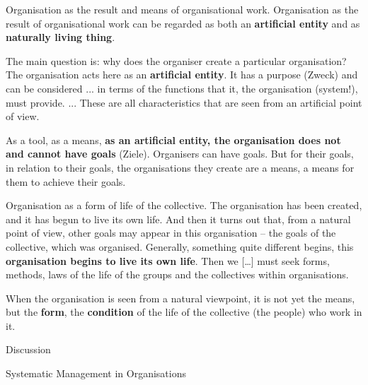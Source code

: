 \documentclass{beamer}
\begin{document}
\begin{frame}{Organisation as the result and means of organisational work.}
Organisation as the result of organisational work can be regarded as both an
\textbf{artificial entity} and as \textbf{naturally living thing}.

The main question is: why does the organiser create a particular organisation?
The organisation acts here as an \textbf{artificial entity}. It has a purpose
(Zweck) and can be considered ... in terms of the functions that it, the
organisation (system!), must provide. ... These are all characteristics that
are seen from an artificial point of view.

As a tool, as a means, \textbf{as an artificial entity, the organisation does
  not and cannot have goals} (Ziele). Organisers can have goals. But for their
goals, in relation to their goals, the organisations they create are a means,
a means for them to achieve their goals.

\end{frame}

\begin{frame}{Organisation as a form of life of the collective.}
The organisation has been created, and it has begun to live its own life. And
then it turns out that, from a natural point of view, other goals may appear
in this organisation – the goals of the collective, which was
organised. Generally, something quite different begins, this
\textbf{organisation begins to live its own life}. Then we [\ldots] must seek
forms, methods, laws of the life of the groups and the collectives within
organisations.

When the organisation is seen from a natural viewpoint, it is not yet the
means, but the \textbf{form}, the \textbf{condition} of the life of the
collective (the people) who work in it.

\begin{center}\Large Discussion  \end{center}
 
\end{frame}

\begin{frame}{Systematic Management in Organisations}
\end{frame}
\end{document}
